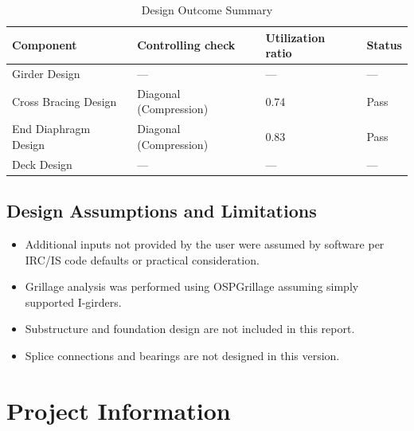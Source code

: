 \documentclass[12pt,a4paper]{report}
\numberwithin{figure}{chapter}
\begin{document}
\begin{table}[H]
\centering
{}
\caption{Design Outcome Summary}
\begin{tabular}{|L{3.88cm}|L{5.34cm}|C{2.72cm}|C{1.75cm}|}
\hline
\textbf{Component} & \textbf{Controlling check} & \textbf{Utilization ratio} & \textbf{Status} \\
\hline
Girder Design & --- & --- & --- \\
\hline
Cross Bracing Design & Diagonal (Compression) & 0.74 & Pass \\
\hline
End Diaphragm Design & Diagonal (Compression) & 0.83 & Pass \\
\hline
Deck Design & --- & --- & --- \\
\hline
\end{tabular}
\end{table}

\section*{Design Assumptions and Limitations}
\label{sec:assumptions}

\begin{itemize}
\item Additional inputs not provided by the user were assumed by software per IRC/IS code defaults or practical consideration.
\item Grillage analysis was performed using OSPGrillage assuming simply supported I-girders.
\item Substructure and foundation design are not included in this report.
\item Splice connections and bearings are not designed in this version.
\end{itemize}

\renewcommand{\thetable}{\thechapter.\arabic{table}}
\titleformat{\chapter}[block]{\normalfont\Large\bfseries\centering}{\thechapter}{1em}{}
\titlespacing*{\chapter}{0pt}{-30pt}{10pt}


\chapter{Project Information}
\end{document}

